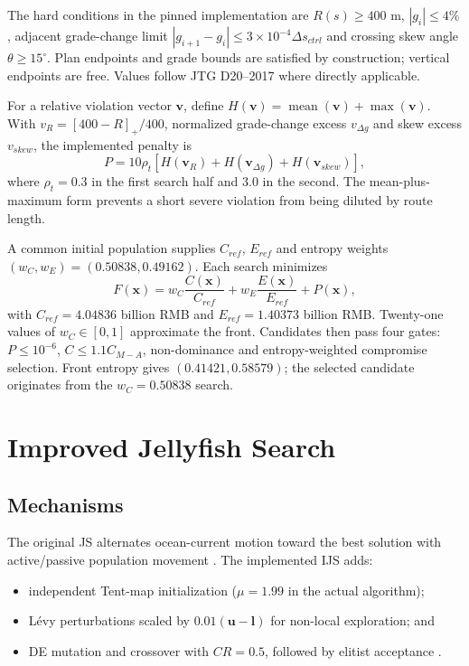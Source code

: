 \documentclass[preprint,12pt]{elsarticle}
\begin{document}
The hard conditions in the pinned implementation are $R(s)\geq400$ m, $|g_i|\leq4\%$, adjacent grade-change limit $|g_{i+1}-g_i|\leq3\times10^{-4}\Delta s_{ctrl}$ and crossing skew angle $\theta\geq15^\circ$. Plan endpoints and grade bounds are satisfied by construction; vertical endpoints are free. Values follow JTG D20--2017 \cite{jtgd20} where directly applicable.

For a relative violation vector $\bm v$, define $H(\bm v)=\operatorname{mean}(\bm v)+\max(\bm v)$. With $v_R=[400-R]_+/400$, normalized grade-change excess $v_{\Delta g}$ and skew excess $v_{skew}$, the implemented penalty is
\begin{equation}
P=10\rho_t[H(\bm v_R)+H(\bm v_{\Delta g})+H(\bm v_{skew})],
\label{eq:penalty}
\end{equation}
where $\rho_t=0.3$ in the first search half and $3.0$ in the second. The mean-plus-maximum form prevents a short severe violation from being diluted by route length.

A common initial population supplies $C_{ref}$, $E_{ref}$ and entropy weights $(w_C,w_E)=(0.50838,0.49162)$. Each search minimizes
\begin{equation}
F(\bm x)=w_C\frac{C(\bm x)}{C_{ref}}+w_E\frac{E(\bm x)}{E_{ref}}+P(\bm x),
\label{eq:scalar}
\end{equation}
with $C_{ref}=4.04836$ billion RMB and $E_{ref}=1.40373$ billion RMB. Twenty-one values of $w_C\in[0,1]$ approximate the front. Candidates then pass four gates: $P\leq10^{-6}$, $C\leq1.1C_{M-A}$, non-dominance and entropy-weighted compromise selection. Front entropy gives $(0.41421,0.58579)$; the selected candidate originates from the $w_C=0.50838$ search.

\section{Improved Jellyfish Search}\label{sec:solver}

\subsection{Mechanisms}

The original JS alternates ocean-current motion toward the best solution with active/passive population movement \cite{chou2021}. The implemented IJS adds:

\begin{itemize}[leftmargin=*]
\item independent Tent-map initialization ($\mu=1.99$ in the actual algorithm);
\item L\'evy perturbations scaled by $0.01(\bm u-\bm l)$ for non-local exploration; and
\item DE mutation and crossover with $CR=0.5$, followed by elitist acceptance \cite{storn1997}.
\end{itemize}
\end{document}
